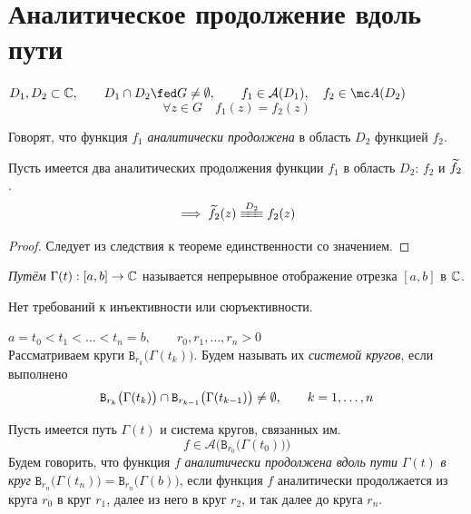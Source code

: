 \section{Аналитическое продолжение вдоль пути}

\begin{definition}
	$ D_1, D_2 \sub \Co, \qquad D_1 \cap D_2 \fed G \ne \O, \qquad f_1 \in \mathcal A(D_1), \quad f_2 \in \mc A(D_2) $
	$$ \forall z \in G \quad f_1(z) = f_2(z) $$

	Говорят, что функция $ f_1 $ \emph{аналитически продолжена} в область $ D_2 $ функцией $ f_2 $.
\end{definition}

\begin{theorem}
	Пусть имеется два аналитических продолжения функции $ f_1 $ в область $ D_2 $: $ f_2 $ и $ \widetilde{f_2} $.
	$$ \implies \vawe{f_2}(z) \equiv[D_2] f_2(z) $$
\end{theorem}

\begin{proof}
	Следует из следствия к теореме единственности со значением.
\end{proof}

\begin{definition}
	\emph{Путём} $ \Gamma(t) : [a, b] \to \mathbb{C} $ называется непрерывное отображение отрезка $ [a, b] $ в $ \mathbb{C} $.
\end{definition}

\begin{remark}
	Нет требований к инъективности или сюръективности.
\end{remark}

\begin{definition}
	$ a = t_0 < t_1 < \dots < t_n = b, \qquad r_0, r_1, \dots, r_n > 0 $ \\
	Рассматриваем круги $ \mathtt B_{r_k} \big( \Gamma(t_k) \big) $.
	Будем называть их \emph{системой кругов}, если выполнено
	$$ \mathtt B_{r_k} \big( \Gamma(t_k) \big) \cap \mathtt B_{r_{k - 1}} \big( \Gamma(t_{k - 1}) \big) \ne \emptyset, \qquad k = 1, \dots, n $$
\end{definition}

\begin{definition}
	Пусть имеется путь $ \Gamma(t) $ и система кругов, связанных им.
	$$ f \in \mathcal A \bigg( \mathtt B_{r_0} \big( \Gamma(t_0) \big) \bigg) $$
	Будем говорить, что функция $ f $ \emph{аналитически продолжена вдоль пути} $ \Gamma(t) $ \emph{в круг} $ \mathtt B_{r_n} \big( \Gamma(t_n) \big) = \mathtt B_{r_n} \big( \Gamma(b) \big) $, если функция $ f $ аналитически продолжается из круга $ r_0 $ в круг $ r_1 $, далее из него в круг $ r_2 $, и так далее до круга $ r_n $.
\end{definition}

